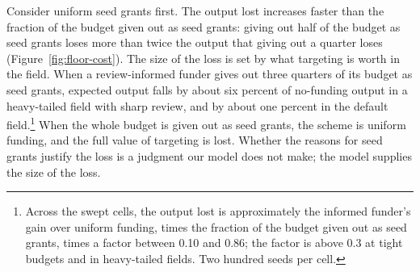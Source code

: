 \documentclass[article, 11pt, reqno]{amsart}
\theoremstyle{named}
\begin{document}
Consider uniform seed grants first. The output lost increases faster than the
fraction of the budget given out as seed grants: giving out half of the budget as
seed grants loses more than twice the output that giving out a quarter loses
(Figure~\ref{fig:floor-cost}). The size of the loss is set by what targeting is worth
in the field. When a review-informed funder gives out three quarters of its budget as
seed grants, expected output falls by about six percent of no-funding output in a
heavy-tailed field with sharp review, and by about one percent in the default
field.\footnote{Across the swept cells, the output lost is approximately the informed
funder's gain over uniform funding, times the fraction of the budget given out as
seed grants, times a factor between 0.10 and 0.86; the factor is above 0.3 at tight
budgets and in heavy-tailed fields. Two hundred seeds per cell.} When the whole
budget is given out as seed grants, the scheme is uniform funding, and the full value
of targeting is lost. Whether the reasons for seed grants justify the loss is a
judgment our model does not make; the model supplies the size of the loss.


\end{document}
